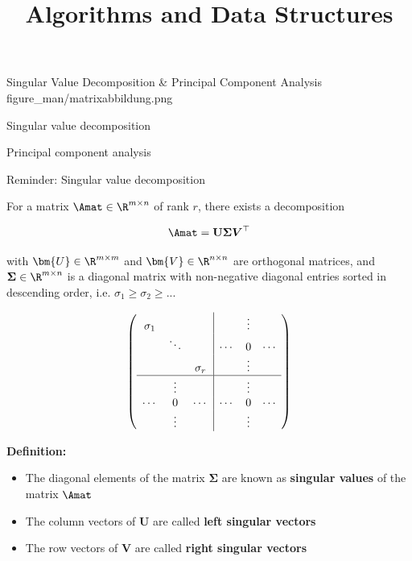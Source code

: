 \documentclass[11pt,compress,t,notes=noshow, xcolor=table]{beamer}
\title{Algorithms and Data Structures}
\begin{document}
{Singular Value Decomposition \& Principal Component Analysis}
{figure_man/matrixabbildung.png}
{
  \item Singular value decomposition
  \item Principal component analysis
}

\begin{vbframe}{Reminder: Singular value decomposition}

For a matrix $\Amat\in \R^{m \times n}$ of rank $r$, there exists a decomposition 

\vspace*{-0.4cm}
\begin{eqnarray*}
\Amat = \mathbf{U} \boldsymbol{\Sigma} \boldsymbol{V}^\top
\end{eqnarray*}

with $\bm{U} \in \R^{m \times m}$ and $\bm{V} \in \R^{n \times n}$ are orthogonal matrices, and $\boldsymbol{\Sigma}\in \R^{m \times n}$ is a diagonal matrix with non-negative diagonal entries sorted in descending order, i.e. $\sigma_1 \ge \sigma_2 \ge ... $

\begin{footnotesize}
$$
\left(\begin{array}{ccc|ccc}
\sigma_1 & & & & \vdots & \\
  & \ddots   &   & \cdots & 0      & \cdots \\
  &   & \sigma_r & & \vdots & \\
\hline
  &  \vdots  &   & & \vdots & \\
\cdots   &  0       & \cdots   & \cdots & 0      & \cdots \\
  &  \vdots  &   & & \vdots & \\

\end{array}\right)
$$
\end{footnotesize}

\framebreak 


\textbf{Definition:}
\begin{itemize}
\item The diagonal elements of the matrix $\boldsymbol{\Sigma}$ are known as \textbf{singular values} of the matrix $\Amat$
\item The column vectors of $\mathbf{U}$ are called \textbf{left singular vectors}
\item The row vectors of $\mathbf{V}$ are called \textbf{right singular vectors}
\end{itemize}


\end{vbframe}
\end{document}
